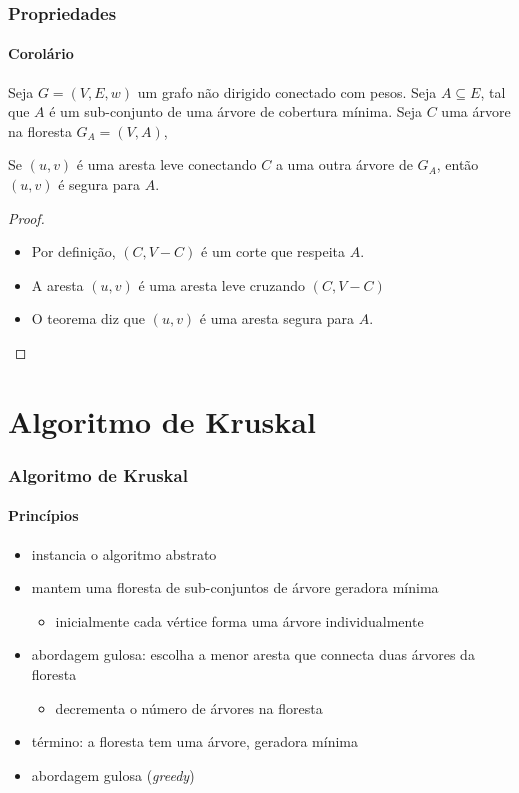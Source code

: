 \documentclass{beamer}
\begin{document}
\begin{frame}
\frametitle{Propriedades}
\framesubtitle{Corolário}

\begin{corollary}
Seja $G = (V, E, w)$ um grafo não dirigido conectado com pesos. 
Seja $A \subseteq E$, tal que $A$ é um sub-conjunto de uma árvore de
cobertura mínima. Seja $C$ uma árvore na floresta $G_A = (V, A)$,

Se $(u, v)$ é uma aresta leve conectando $C$ a uma outra árvore
de $G_A$, então $(u, v)$ é segura para $A$.
\end{corollary}

\begin{proof}
\begin{itemize}
\item Por definição, $(C, V-C)$ é um corte que respeita $A$. 
\item A aresta $(u, v)$ é uma aresta leve cruzando $(C, V-C)$
\item O teorema diz que $(u, v)$ é uma aresta segura para $A$.
\end{itemize}
\end{proof}
\end{frame}

\section{Algoritmo de Kruskal}

\begin{frame}
\frametitle{Algoritmo de Kruskal}
\framesubtitle{Princípios}

\begin{itemize}
\item instancia o algoritmo abstrato
\item mantem uma floresta de sub-conjuntos de árvore geradora mínima
\begin{itemize}
\item inicialmente cada vértice forma uma árvore individualmente
\end{itemize}
\item abordagem gulosa: escolha a menor aresta que connecta duas árvores
  da floresta
\begin{itemize}
\item decrementa o número de árvores na floresta
\end{itemize}
\item término: a floresta tem uma árvore, geradora mínima
\item \alert{abordagem gulosa} (\textit{greedy\/})
\end{itemize}

\end{frame}
\end{document}
